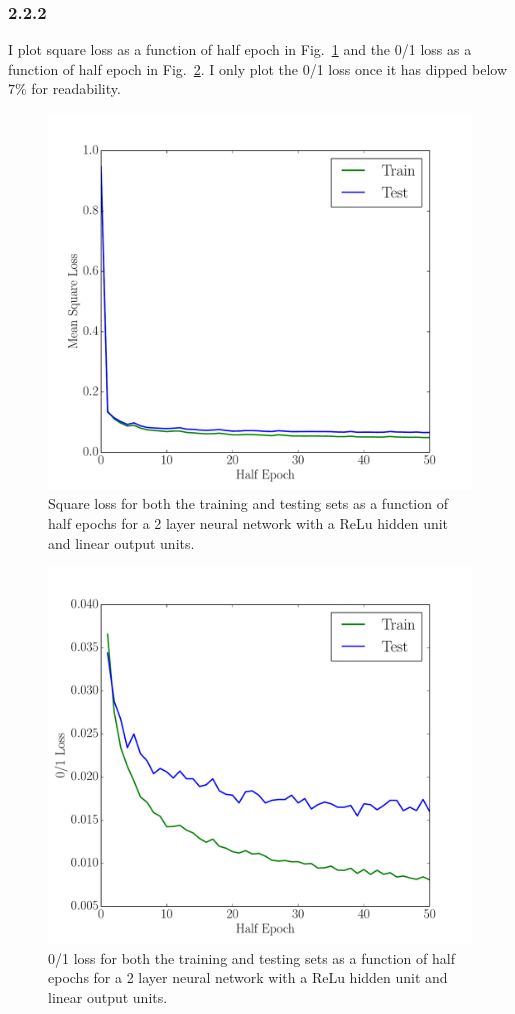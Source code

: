 \documentclass[12pt]{amsart}
\begin{document}
\subsubsection*{2.2.2}
I plot square loss as a function of half epoch in Fig.~\ref{fig:relu_linear_sq} and the 0/1 loss as a function of half epoch in Fig.~\ref{fig:relu_linear_01}.  I only plot the 0/1 loss once it has dipped below $7\%$ for readability.
\begin{figure}[H]
	\includegraphics[width=\columnwidth]{relu_linear_sq.pdf}
    \caption{Square loss for both the training and testing sets as a function of half epochs for a 2 layer neural network with a ReLu hidden unit and linear output units.}
    \label{fig:relu_linear_sq}
\end{figure}
\begin{figure}[H]
	\includegraphics[width=\columnwidth]{relu_linear_01.pdf}
    \caption{0/1 loss for both the training and testing sets as a function of half epochs for a 2 layer neural network with a ReLu hidden unit and linear output units.}
    \label{fig:relu_linear_01}
\end{figure}
\end{document}
